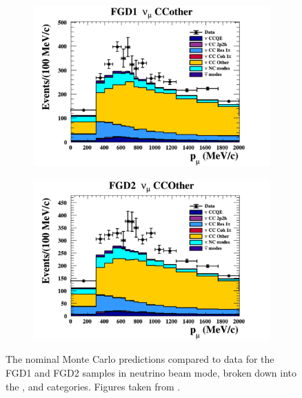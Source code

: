 \begin{figure}[h]
\begin{subfigure}[t]{0.49\textwidth}
    \includegraphics[width=\textwidth, trim={0mm 0mm 0mm 0mm}, clip,page=1]{Figures/Selections/Pmu_1D_modes_FGD1_numuCC_other_Data_prefit.pdf}
  \end{subfigure}%
  \begin{subfigure}[t]{0.49\textwidth}
    \includegraphics[width=\textwidth, trim={0mm 0mm 0mm 0mm}, clip,page=1]{Figures/Selections/Pmu_1D_modes_FGD2_numuCC_other_Data_prefit.pdf}
  \end{subfigure}
  \caption{The nominal Monte Carlo predictions compared to data for the FGD1 and FGD2 samples in neutrino beam mode, broken down into the ,  and  categories. Figures taken from \cite{t2k_tn_395}.}
  \label{fig:SelsAndSysts_Beam_NDPred}
\end{figure}

